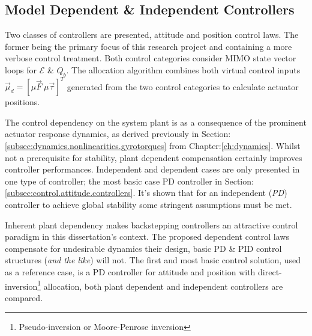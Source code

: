 \subsection*{Model Dependent \& Independent Controllers}
Two classes of controllers are presented, attitude and position control laws. The former being the primary focus of this research project and containing a more verbose control treatment. Both control categories consider MIMO state vector loops for $\mathcal{E}$ \& $Q_b$. The allocation algorithm combines both virtual control inputs $\vec{\mu}_d=[\mu\vec{F}~\mu\vec{\tau}]^T$ generated from the two control categories to calculate actuator positions.
\par
The control dependency on the system plant is as a consequence of the prominent actuator response dynamics, as derived previously in Section:\ref{subsec:dynamics.nonlinearities.gyrotorques} from Chapter:\ref{ch:dynamics}. Whilst not a prerequisite for stability, plant dependent compensation certainly improves controller performances. Independent and dependent cases are only presented in one type of controller; the most basic case PD controller in Section:\ref{subsec:control.attitude.controllers}. It's shown that for an independent (\emph{PD}) controller to achieve global stability some stringent assumptions must  be met.
\par
Inherent plant dependency makes backstepping controllers an attractive control paradigm in this dissertation's context. The proposed dependent control laws compensate for undesirable dynamics their design, basic PD \& PID control structures (\emph{and the like}) will not. The first and most basic control solution, used as a reference case, is a PD controller for attitude and position with direct-inversion\footnote{Pseudo-inversion or Moore-Penrose inversion} allocation, both plant dependent and independent controllers are compared.
